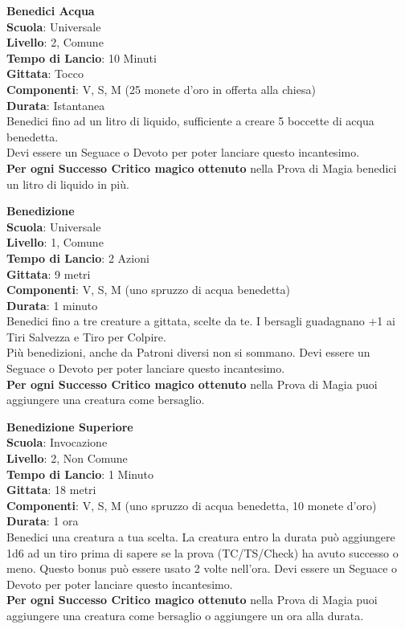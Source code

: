\begin{multicols}{2}
\medskip\textbf{Benedici Acqua}\\
\textbf{Scuola}: Universale\\
\textbf{Livello}: 2, Comune\\
\textbf{Tempo di Lancio}: 10 Minuti\\
\textbf{Gittata}: Tocco\\
\textbf{Componenti}: V, S, M (25 monete d'oro in offerta alla chiesa)\\
\textbf{Durata}: Istantanea\\
Benedici fino ad un litro di liquido, sufficiente a creare 5 boccette di acqua benedetta.\\
Devi essere un Seguace o Devoto per poter lanciare questo incantesimo.\\
\textbf{Per ogni Successo Critico magico ottenuto} nella Prova di Magia benedici un litro di liquido in più.

\medskip\textbf{Benedizione}\\
\textbf{Scuola}: Universale\\
\textbf{Livello}: 1, Comune\\
\textbf{Tempo di Lancio}: 2 Azioni\\
\textbf{Gittata}: 9 metri\\
\textbf{Componenti}: V, S, M (uno spruzzo di acqua benedetta)\\
\textbf{Durata}: 1 minuto\\
Benedici fino a tre creature a gittata, scelte da te. I bersagli guadagnano +1 ai Tiri Salvezza e Tiro per Colpire.\\
Più benedizioni, anche da Patroni diversi non si sommano. Devi essere un Seguace o Devoto per poter lanciare questo incantesimo.\\
\textbf{Per ogni Successo Critico magico ottenuto} nella Prova di Magia puoi aggiungere una creatura come bersaglio.

\medskip\textbf{Benedizione Superiore}\\
\textbf{Scuola}: Invocazione\\
\textbf{Livello}: 2, Non Comune\\
\textbf{Tempo di Lancio}: 1 Minuto\\
\textbf{Gittata}: 18 metri\\
\textbf{Componenti}: V, S, M (uno spruzzo di acqua benedetta, 10 monete d'oro)\\
\textbf{Durata}: 1 ora\\
Benedici una creatura a tua scelta. La creatura entro la durata può aggiungere 1d6 ad un tiro prima di sapere se la prova (TC/TS/Check) ha avuto successo o meno. Questo bonus può essere usato 2 volte nell'ora. Devi essere un Seguace o Devoto per poter lanciare questo incantesimo.\\
\textbf{Per ogni Successo Critico magico ottenuto} nella Prova di Magia puoi aggiungere una creatura come bersaglio o aggiungere un ora alla durata.


\end{multicols}
